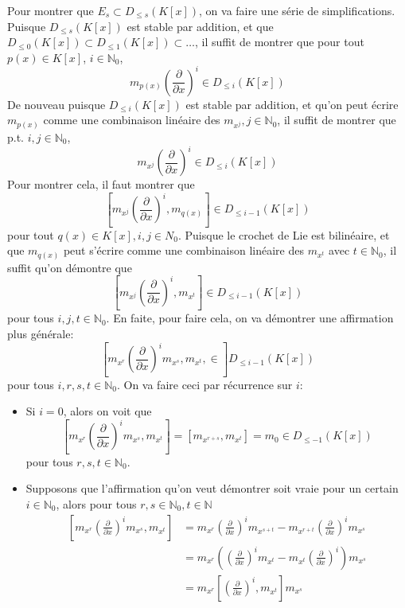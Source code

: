 \documentclass[french]{article}
\newcommand{\mdx}[1]{\left(\frac{\partial}{\partial x}\right)^{#1}}
\newcommand{\DK}[1]{D_{\leq #1} (K[x])}
\newcommand{\N}{\mathbb{N}}
\newcommand{\lie}[2]{\left[#1, #2\right]}
\begin{document}
\begin{enumerate}
		Pour montrer que $E_s \subset \DK{s}$, on va faire une série de
		simplifications. Puisque
		$\DK{s}$ est stable par addition, et que
		$\DK{0} \subset \DK{1} \subset \dots$, il suffit
		de montrer que pour tout $p(x) \in K[x]$, $i\in \N_0$,
		\begin{equation*}
			m_{p(x)}\mdx{i} \in \DK{i}
		\end{equation*}
		De nouveau puisque $\DK{i}$ est stable par addition, et qu'on peut écrire
		$m_{p(x)}$ comme une combinaison linéaire des $m_{x^j}, j\in \N_0$, il
		suffit de montrer que p.t. $i, j\in \N_0$,
		\begin{equation*}
			m_{x^j}\mdx{i}\in \DK{i}
		\end{equation*}
		Pour montrer cela, il faut montrer que
		\begin{equation*}
			\lie{m_{x^j}\mdx{i}}{m_{q(x)}} \in \DK{i-1}
		\end{equation*}
		pour tout $q(x) \in K[x], i,j \in N_0$. Puisque le crochet de Lie est bilinéaire, et
		que $m_{q(x)}$ peut s'écrire comme une combinaison linéaire des $m_{x^t}$
		avec $t \in \N_0$, il suffit qu'on démontre que
		\begin{equation*}
			\lie{m_{x^j}\mdx{i}}{m_{x^t}} \in \DK{i - 1}
		\end{equation*}
		pour tous $i, j, t \in \N_0$. En faite, pour faire cela, on va démontrer
		une affirmation plus générale:
		\begin{equation*}
			\lie{m_{x^r}\mdx{i}m_{x^s}, m_{x^t}} \in \DK{i-1}
		\end{equation*}
		pour tous $i, r, s, t \in \N_0$.
		On va faire ceci par récurrence sur $i$:
		\begin{itemize}
			\item Si $i = 0$, alors on voit que
			\begin{equation*}
				\lie{m_{x^r}\mdx{i}m_{x^s}}{m_{x^t}} = \lie{m_{x^{r+s}}}{m_{x^{t}}} =
				m_0 \in \DK{-1}
			\end{equation*}
			pour tous $r, s, t \in \N_0$.
		\item Supposons que l'affirmation qu'on veut démontrer soit vraie pour un
			certain $i \in \N_0$, alors pour tous $r, s \in \N_0, t\in \N$
			\begin{align*}
				\lie{m_{x^r}\mdx{i}m_{x^s}}{m_{x^t}}
				&= m_{x^r}\mdx{i}m_{x^{s + t}} - m_{x^{r + t}}\mdx{i}m_{x^s}\\
				&= m_{x^r}\left(\mdx{i}m_{x^{t}} - m_{x^{t}}\mdx{i}\right)m_{x^s}\\
				&= m_{x^r}\lie{\mdx{i}}{m_{x^t}}m_{x^s}\\

\end{align*}
\end{itemize}
\end{enumerate}
\end{document}
